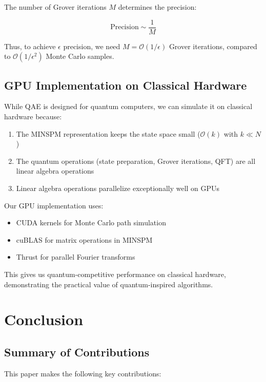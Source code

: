 \documentclass[12pt]{article}
\begin{document}
The number of Grover iterations $M$ determines the precision:

\begin{equation}
\text{Precision} \sim \frac{1}{M}
\end{equation}

Thus, to achieve $\epsilon$ precision, we need $M = \mathcal{O}(1/\epsilon)$ Grover iterations, compared to $\mathcal{O}(1/\epsilon^2)$ Monte Carlo samples.

\subsection{GPU Implementation on Classical Hardware}

While QAE is designed for quantum computers, we can simulate it on classical hardware because:

\begin{enumerate}
    \item The MINSPM representation keeps the state space small ($\mathcal{O}(k)$ with $k \ll N$)
    \item The quantum operations (state preparation, Grover iterations, QFT) are all linear algebra operations
    \item Linear algebra operations parallelize exceptionally well on GPUs
\end{enumerate}

Our GPU implementation uses:
\begin{itemize}
    \item CUDA kernels for Monte Carlo path simulation
    \item cuBLAS for matrix operations in MINSPM
    \item Thrust for parallel Fourier transforms
\end{itemize}

This gives us quantum-competitive performance on classical hardware, demonstrating the practical value of quantum-inspired algorithms.

\section{Conclusion}

\subsection{Summary of Contributions}

This paper makes the following key contributions:
\end{document}
